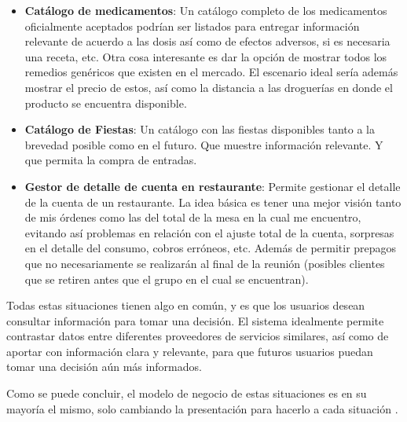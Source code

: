 \begin{itemize}
			\item
				\textbf{Catálogo de medicamentos}: Un catálogo completo de los medicamentos oficialmente aceptados podrían ser listados para entregar información relevante de acuerdo a las dosis así como de efectos adversos, si es necesaria una receta, etc. Otra cosa interesante es dar la opción de mostrar todos los remedios genéricos que existen en el mercado. El escenario ideal sería además mostrar el precio de estos, así como la distancia a las droguerías en donde el producto se encuentra disponible.
			
			
			\item
				\textbf{Catálogo de Fiestas}: Un catálogo con las fiestas disponibles tanto a la brevedad posible como en el futuro. Que muestre información relevante. Y que permita la compra de entradas.
			
			\item
				\textbf{Gestor de detalle de cuenta en restaurante}: Permite gestionar el detalle de la cuenta de un restaurante. La idea básica es tener una mejor visión tanto de mis órdenes como las del total de la mesa en la cual me encuentro, evitando así problemas en relación con el ajuste total de la cuenta, sorpresas en el detalle del consumo, cobros erróneos, etc. Además de permitir prepagos que no necesariamente se realizarán al final de la reunión (posibles clientes que se retiren antes que el grupo en el cual se encuentran).
			
		\end{itemize}

		Todas estas situaciones tienen algo en común, y es que los usuarios desean consultar información para tomar una decisión. El sistema idealmente permite contrastar datos entre diferentes proveedores de servicios similares, así como de aportar con información clara y relevante, para que futuros usuarios puedan tomar una decisión aún más informados.

				Como se puede concluir, el modelo de negocio de estas situaciones es en su mayoría el mismo, solo cambiando la presentación para hacerlo \adhoc a cada situación \citeAllFrameworks.

